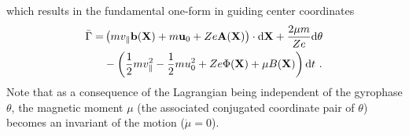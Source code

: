 which results in the fundamental one-form in guiding center coordinates
\begin{gather}
    \begin{aligned}
        \bar{\Gamma} =  &\left(m v_\parallel \boldsymbol{\mathbf{b}}(\boldsymbol{\mathbf{X}}) + m\boldsymbol{\mathbf{u}}_0 + Ze\boldsymbol{\mathbf{A}}(\boldsymbol{\mathbf{X}})\right) \cdot \mathrm{d}\boldsymbol{\mathbf{X}} + \frac{2\mu m}{Ze} \mathrm{d}\theta \\
                                  &- \left(\frac{1}{2}mv_\parallel^2 - \frac{1}{2}mu_0^2 + Ze\Phi(\boldsymbol{\mathbf{X}}) + \mu B(\boldsymbol{\mathbf{X}}) \right) \mathrm{d}t~.
    \end{aligned}
    \label{eq:guidingcenterLagrangian}
\end{gather}
Note that as a consequence of the Lagrangian being independent of the gyrophase $\theta$, the magnetic moment $\mu$ (the associated conjugated coordinate pair of $\theta$) becomes an invariant of the motion ($\dot{\mu} = 0$). \bigskip

